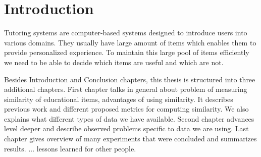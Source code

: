 \documentclass[
  digital, %
  table,   %
  nolof,     %
  nolot,     %
  nocover
]{fithesis3}
\begin{document}
%
%
%
%
%
%

\chapter*{Introduction}



Tutoring systems are computer-based systems designed to introduce users
into various domains. They usually have large amount of items which
enables them to provide personalized experience. To maintain this large
pool of items efficiently we need to be able to decide which items are
useful and which are not.





Besides Introduction and Conclusion chapters, this thesis is structured
into three additional chapters. First chapter talks in general about
problem of measuring similarity of educational items, advantages of using similarity.
It describes previous work and different proposed metrics for computing similarity. We also explains what different types of data we have
available.
Second chapter advances level deeper and describe observed problems specific to data we are using.
Last chapter gives overview of many experiments that were concluded and summarizes results.
... lessons learned for other people.
\end{document}
